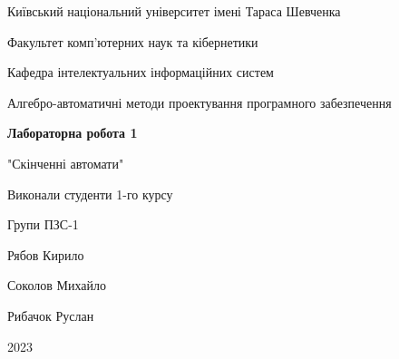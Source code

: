 \documentclass[12pt,a4paper]{article}
\begin{document}
\begin{titlepage}
    \centering
    \vspace*{1cm}
    
    \Large
    Київський національний університет імені Тараса Шевченка \\
    
    \vspace{0.5cm}
    
    \large
    Факультет комп'ютерних наук та кібернетики \\
    
    \vspace{0.5cm}
    
    Кафедра інтелектуальних інформаційних систем \\
    
    \vspace{0.5cm}
    
    Алгебро-автоматичні методи проектування програмного забезпечення \\
    
    \vspace{3cm}
    
    \textbf{Лабораторна робота 1} \\
    
    \vspace{0.5cm}
    
    "Скінченні автомати" \\
    
    \vspace{2cm}
    
    Виконали студенти 1-го курсу \\

    \vspace{0.2cm}
    
    Групи ПЗС-1 \\

    \vspace{0.1cm}
    
    Рябов Кирило \\

    \vspace{0.1cm}
    
    Соколов Михайло \\

    \vspace{0.1cm}
    
    Рибачок Руслан \\
    
    \vfill
    
    2023
    
\end{titlepage}
\end{document}
